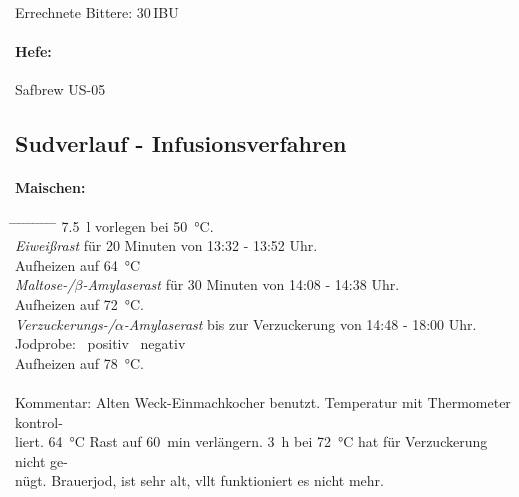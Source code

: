 \documentclass[12pt,oneside,a4paper]{scrartcl}
\begin{document}
\vspace{.25cm}
\hspace{1cm}Errechnete Bittere: 30\,IBU
%
\paragraph{Hefe:}
	Safbrew US-05

%
\subsection*{Sudverlauf - Infusionsverfahren}	

\paragraph{Maischen:}
	\begin{tabbing}\hspace{1cm} \=
		\hspace{1cm} \= \hspace{1cm} \=\hspace{1cm} \=\hspace{1cm} \=\hspace{1cm} \= \hspace{1cm} \= \hspace{1cm} \= \hspace{1cm} \= \hspace{1cm} \= \kill
		\> \SI{7,5}{\litre} vorlegen bei \SI{50}{\celsius}.\\
		\> \textit{Eiweißrast} für 20 Minuten von 13:32 - 13:52 Uhr.\\
		\> \> Aufheizen auf \SI{64}{\celsius}\\
		\> \textit{Maltose-/$\beta$-Amylaserast} für 30 Minuten von 14:08 - 14:38 Uhr.\\
		\> \> Aufheizen auf \SI{72}{\celsius}.\\
		\> \textit{Verzuckerungs-/$\alpha$-Amylaserast} bis zur Verzuckerung von 14:48 - 18:00 Uhr.\\
		\> \> \> Jodprobe: \> \> \CheckedBox \ positiv \> \> \Square \ negativ\\
		\> \> Aufheizen auf \SI{78}{\celsius}.\\\\
		\> Kommentar: \>\>\> Alten Weck-Einmachkocher benutzt. Temperatur mit Thermometer kontrol-\\
		\>\>\>liert. \SI{64}{\celsius} Rast auf \SI{60}{\minute} verlängern. \SI{3}{\hour} bei \SI{72}{\celsius} hat für Verzuckerung nicht ge-\\
		\>\>\>nügt. Brauerjod, ist sehr alt, vllt funktioniert es nicht mehr.\\
	\end{tabbing}
\end{document}
